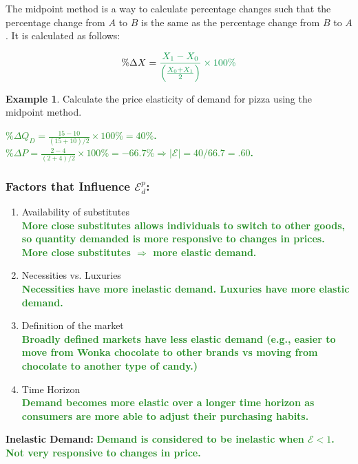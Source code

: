 \documentclass[11pt]{article}\usepackage[]{graphicx}\usepackage[]{color}
\theoremstyle{definition}
\newtheorem{exmp}{Example}[section]
\newcommand{\blank}[1]{}
\newcommand{\ddp}[1]{{\textbf{\textcolor{ForestGreen}{#1}}}}
\newcommand{\defn}[1]{\textbf{#1}}
\begin{document}
		The midpoint method is a way to calculate percentage changes such that the percentage change from $A$ to $B$ is the same as the percentage change from $B$ to $A$. It is calculated as follows:
		
		
		\begin{equation*}
		\%\Delta X = \ddp{$\frac{X_1 - X_0}{\Big(\frac{X_0+X_1}{2}\Big)} \times 100\%$}
		\end{equation*}
		
		
		\begin{exmp}
			Calculate the price elasticity of demand for pizza using the midpoint method.
		\end{exmp}
		\ddp{$\%\Delta Q_D = \frac{15 - 10}{(15+10)/2} \times 100\% = 40\%$. $\%\Delta P = \frac{2-4}{(2+4)/2} \times 100\% = -66.7\% \Rightarrow |\mathcal{E}| = 40/66.7 = .60$.\\}
		\blank{}

	\subsubsection*{Factors that Influence $\mathcal{E}_d^p$:}
	
	
	\begin{enumerate}
		\setlength{\itemsep}{15pt}
		\item Availability of substitutes 
		\ddp{\\More close substitutes allows individuals to switch to other goods, so quantity demanded is more responsive to changes in prices. More close substitutes  $\Rightarrow$ more elastic demand.}
		\item Necessities vs. Luxuries
		\ddp{\\ Necessities have more inelastic demand. Luxuries have more elastic demand.}
		\item Definition of the market
		\ddp{\\Broadly defined markets have less elastic demand (e.g., easier to move from Wonka chocolate to other brands vs moving from chocolate to another type of candy.)}
		\item Time Horizon
		\ddp{\\Demand becomes more elastic over a longer time horizon as consumers are more able to adjust their purchasing habits.}
	\end{enumerate}
	

	
	
	\defn{Inelastic Demand:} \ddp{Demand is considered to be inelastic when $\mathcal{E} < 1$. Not very responsive to changes in price.\\}
	
\end{document}
